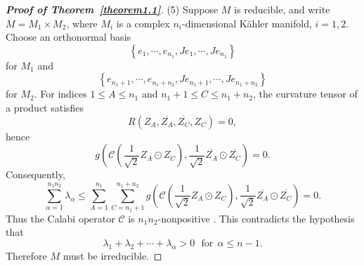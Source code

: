 \documentclass[10pt,a4paper]{amsart}
\begin{document}
\begin{proof}[{\bf Proof of Theorem~\ref{theorem1.1}}]
(5) Suppose $M$ is reducible, and write $M = M_1 \times M_2$, where $M_i$ is a complex $n_i$-dimensional K{\"a}hler manifold, $i=1,2$. Choose an orthonormal basis $$\left\{ {{e_1}, \cdots ,{e_{{n_1}}}} , {{Je_1}, \cdots ,{Je_{{n_1}}}} \right\}$$ for $M_1$ and $$\left\{ {{e_{{n_1} + 1}}, \cdots ,{e_{{n_1} + {n_2}}}},{{Je_{{n_1} + 1}}, \cdots ,{Je_{{n_1} + {n_2}}}} \right\}$$ for $ M_2$. For indices $1 \le A \le {n_1}$ and ${n_1} + 1 \le C \le {n_1} + {n_2}$, the curvature tensor of a product satisfies
$$ R\left( {{Z_A},\overline {{Z_A}} ,\overline {{Z_C}} ,{Z_C}} \right) = 0, $$
hence
$$g\left( {\mathcal{C}\left( {\frac{1}{{\sqrt 2 }}{Z_A} \odot {Z_C}} \right),\frac{1}{{\sqrt 2 }}\overline {{Z_A}}  \odot \overline {{Z_C}} } \right) =0.$$
Consequently,
$$\sum\limits_{\alpha  = 1}^{{n_1}  {n_2}} {{\lambda _\alpha }}  \le \sum\limits_{A = 1}^{{n_1}} {\sum\limits_{C = {n_1} + 1}^{{n_1} + {n_2}} {g\left( {\mathcal{C}\left( {\frac{1}{{\sqrt 2 }}{Z_A} \odot {Z_C}} \right),\frac{1}{{\sqrt 2 }}\overline {{Z_A}}  \odot \overline {{Z_C}} } \right)} }  = 0.$$
Thus the Calabi operator  $\mathcal{C}$ is $ {n_1}{n_2} $-nonpositive . This contradicts the hypothesis that $${\lambda _1} + {\lambda _2} +  \cdots  + {\lambda _\alpha} > 0\ \ \  \text{for}\ \   \alpha \le n-1.$$ Therefore $M$ must be irreducible.
\end{proof}
\end{document}
